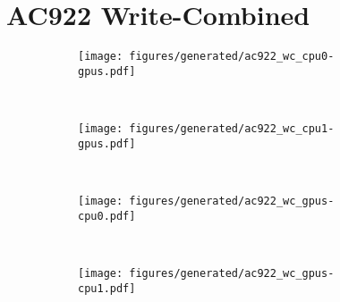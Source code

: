 \section{AC922 Write-Combined}

\begin{figure}[H]
    \centering
    \begin{subfigure}[b]{0.45\textwidth}
        \texttt{[image: figures/generated/ac922\_wc\_cpu0-gpus.pdf]}
        \caption{}
        \label{}
    \end{subfigure}
    ~
    \begin{subfigure}[b]{0.45\textwidth}
        \texttt{[image: figures/generated/ac922\_wc\_cpu1-gpus.pdf]}
        \caption{}
        \label{}
    \end{subfigure}
    \\
    \begin{subfigure}[b]{0.45\textwidth}
        \texttt{[image: figures/generated/ac922\_wc\_gpus-cpu0.pdf]}
        \caption{}
        \label{}
    \end{subfigure}
    ~
    \begin{subfigure}[b]{0.45\textwidth}
        \texttt{[image: figures/generated/ac922\_wc\_gpus-cpu1.pdf]}
        \caption{}
        \label{}
    \end{subfigure}
    \caption[]{}
    \label{fig:data-ac922-wc}
\end{figure}

